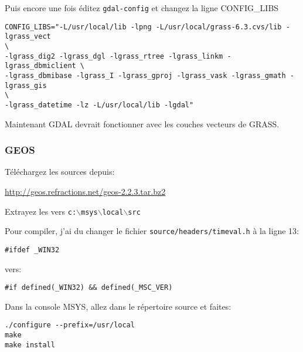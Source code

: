 Puis encore une fois éditez \texttt{gdal-config} et changez la ligne CONFIG\_LIBS

\begin{verbatim}
CONFIG_LIBS="-L/usr/local/lib -lpng -L/usr/local/grass-6.3.cvs/lib -lgrass_vect
\
-lgrass_dig2 -lgrass_dgl -lgrass_rtree -lgrass_linkm -lgrass_dbmiclient \
-lgrass_dbmibase -lgrass_I -lgrass_gproj -lgrass_vask -lgrass_gmath -lgrass_gis
\
-lgrass_datetime -lz -L/usr/local/lib -lgdal" 
\end{verbatim}

Maintenant GDAL devrait fonctionner avec les couches vecteurs de GRASS.

% 
% 
% 

\subsubsection{GEOS}
Téléchargez les sources depuis:

\url{http://geos.refractions.net/geos-2.2.3.tar.bz2}

Extrayez les vers \texttt{c:$\backslash$msys$\backslash$local$\backslash$src}

Pour compiler, j'ai du changer le fichier \texttt{source/headers/timeval.h} à la ligne 13:

\begin{verbatim}
#ifdef _WIN32
\end{verbatim}
vers:

\begin{verbatim}
#if defined(_WIN32) && defined(_MSC_VER)
\end{verbatim}

Dans la console MSYS, allez dans le répertoire source et faites:

\begin{verbatim}
./configure --prefix=/usr/local
make
make install
\end{verbatim}

